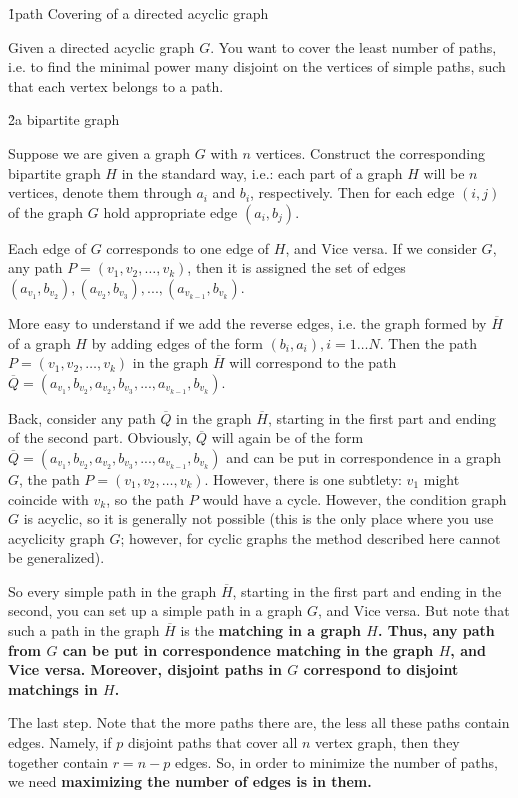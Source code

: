 \h1{path Covering of a directed acyclic graph}

Given a directed acyclic graph $G$. You want to cover the least number of paths, i.e. to find the minimal power many disjoint on the vertices of simple paths, such that each vertex belongs to a path.


\h2{a bipartite graph}

Suppose we are given a graph $G$ with $n$ vertices. Construct the corresponding bipartite graph $H$ in the standard way, i.e.: each part of a graph $H$ will be $n$ vertices, denote them through $a_i$ and $b_i$, respectively. Then for each edge $(i, j)$ of the graph $G$ hold appropriate edge $(a_i, b_j)$.

Each edge of $G$ corresponds to one edge of $H$, and Vice versa. If we consider $G$, any path $P = (v_1, v_2, \ldots, v_k)$, then it is assigned the set of edges $(a_{v_1}, b_{v_2}), (a_{v_2}, b_{v_3}), ..., (a_{v_{k-1}}, b_{v_k}) $.

More easy to understand if we add the reverse edges, i.e. the graph formed by $\overline H$ of a graph $H$ by adding edges of the form $(b_i, a_i), i=1 \ldots N$. Then the path $P = (v_1, v_2, \ldots, v_k)$ in the graph $\overline H$ will correspond to the path $\overline Q = (a_{v_1}, b_{v_2}, a_{v_2}, b_{v_3}, ..., a_{v_{k-1}}, b_{v_k})$.

Back, consider any path $\overline Q$ in the graph $\overline H$, starting in the first part and ending of the second part. Obviously, $\overline Q$ will again be of the form $\overline Q = (a_{v_1}, b_{v_2}, a_{v_2}, b_{v_3}, ..., a_{v_{k-1}}, b_{v_k})$ and can be put in correspondence in a graph $G$, the path $P = (v_1, v_2, \ldots, v_k)$. However, there is one subtlety: $v_1$ might coincide with $v_k$, so the path $P$ would have a cycle. However, the condition graph $G$ is acyclic, so it is generally not possible (this is the only place where you use acyclicity graph $G$; however, for cyclic graphs the method described here cannot be generalized).

So every simple path in the graph $\overline H$, starting in the first part and ending in the second, you can set up a simple path in a graph $G$, and Vice versa. But note that such a path in the graph $\overline H$ is the \bf{matching} in a graph $H$. Thus, any path from $G$ can be put in correspondence matching in the graph $H$, and Vice versa. Moreover, disjoint paths in $G$ correspond to disjoint matchings in $H$.

The last step. Note that the more paths there are, the less all these paths contain edges. Namely, if $p$ disjoint paths that cover all $n$ vertex graph, then they together contain $r = n - p$ edges. So, in order to minimize the number of paths, we need \bf{maximizing the number of edges is} in them.

